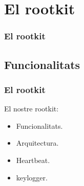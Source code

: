 \documentclass{beamer}
\begin{document}

\section{El rootkit}
\begin{frame}
    \frametitle{El rootkit}
\end{frame}

\subsection{Funcionalitats}

\begin{frame}
    \frametitle{El rootkit}
	\begin{block}{El nostre rootkit:}
		\begin{itemize}
			\item \alert{Funcionalitats.}
			\item Arquitectura.
			\item Heartbeat.
			\item keylogger.
		\end{itemize}
	\end{block}
\end{frame}
\end{document}

